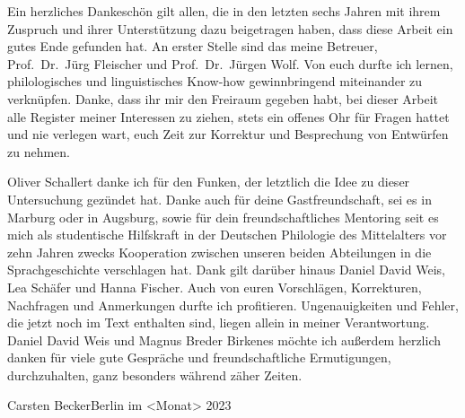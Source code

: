 Ein herzliches Dankeschön gilt allen, die in den letzten sechs Jahren mit ihrem
Zuspruch und ihrer Unterstützung dazu beigetragen haben, dass diese Arbeit ein
gutes Ende gefunden hat. An erster Stelle sind das meine Betreuer,
Prof.~Dr.~Jürg Fleischer und Prof.~Dr.~Jürgen Wolf. Von euch durfte ich lernen,
philologisches und linguistisches Know-how gewinnbringend miteinander zu
verknüpfen. Danke, dass ihr mir den Freiraum gegeben habt, bei dieser Arbeit
alle Register meiner Interessen zu ziehen, stets ein offenes Ohr für Fragen
hattet und nie verlegen wart, euch Zeit zur Korrektur und Besprechung von
Entwürfen zu nehmen.

Oliver Schallert danke ich für den Funken, der letztlich die Idee zu dieser
Untersuchung gezündet hat. Danke auch für deine Gastfreundschaft, sei es in
Marburg oder in Augsburg, sowie für dein freundschaftliches Mentoring seit es
mich als studentische Hilfskraft in der Deutschen Philologie des Mittelalters
vor zehn Jahren zwecks Kooperation zwischen unseren beiden Abteilungen in die
Sprachgeschichte verschlagen hat. Dank gilt darüber hinaus Daniel David Weis,
Lea Schäfer und Hanna Fischer. Auch von euren Vorschlägen, Korrekturen,
Nachfragen und Anmerkungen durfte ich profitieren. Ungenauigkeiten und Fehler,
die jetzt noch im Text enthalten sind, liegen allein in meiner Verantwortung.
Daniel David Weis und Magnus Breder Birkenes möchte ich außerdem herzlich
danken für viele gute Gespräche und freundschaftliche Ermutigungen,
durchzuhalten, ganz besonders während zäher Zeiten.

\bigskip

\noindent%
Carsten Becker\hfill Berlin im <Monat> 2023
